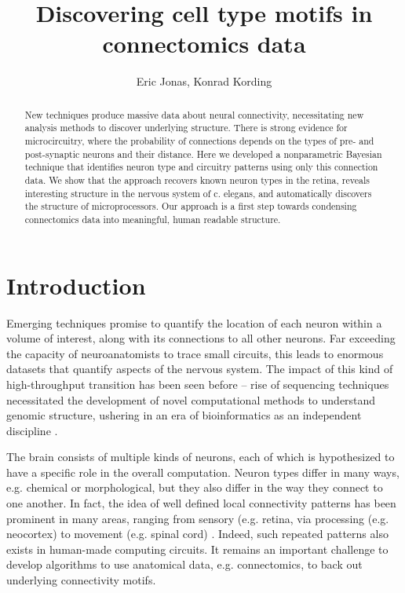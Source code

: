\documentclass{article}
\title{Discovering cell type motifs in connectomics data}
\author{Eric Jonas, Konrad Kording}
\begin{document}
\maketitle


\begin{abstract}
  New techniques produce massive data about neural connectivity,
  necessitating new analysis methods to discover underlying
  structure. There is strong evidence for microcircuitry, where the
  probability of connections depends on the types of pre- and
  post-synaptic neurons and their distance. Here we developed a
  nonparametric Bayesian technique that identifies neuron type and circuitry
  patterns using only this connection data. We show that the approach recovers
  known neuron types in the retina, reveals interesting structure in
  the nervous system of c. elegans, and automatically discovers the
  structure of microprocessors. Our approach is a first step towards
  condensing connectomics data into meaningful, human readable
  structure.
\end{abstract}

\section*{Introduction}
Emerging techniques \autocite{Morgan2013,Zador2012} promise to
quantify the location of each neuron within a volume of interest,
along with its connections to all other neurons. Far exceeding the
capacity of neuroanatomists to trace small circuits, this leads to
enormous datasets that quantify aspects of the nervous system. The impact of
this kind of high-throughput transition has been seen before -- 
rise of sequencing techniques necessitated the
development of novel computational methods to understand genomic
structure, ushering in an era of bioinformatics as an independent
discipline \autocite{}.

The brain consists of multiple kinds of neurons, each of which is
hypothesized to have a specific role in the overall
computation. Neuron types differ in many ways, e.g. chemical or
morphological, but they also differ in the way they connect to one
another. In fact, the idea of well defined local connectivity patterns
has been prominent in many areas, ranging from sensory (e.g. retina,
\autocite{} via processing (e.g. neocortex) to movement (e.g. spinal
cord) \autocite{}. Indeed, such repeated patterns also exists in
human-made computing circuits. It remains an important challenge to
develop algorithms to use anatomical data, e.g. connectomics, to back
out underlying connectivity motifs.
\end{document}

